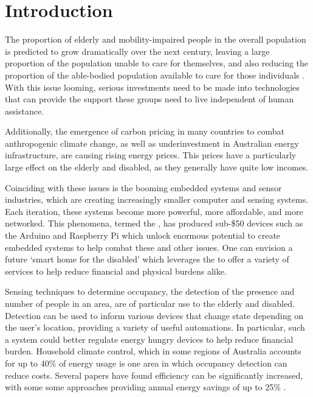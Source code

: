 \documentclass[../thesis/thesis.tex]{subfiles}
\begin{document}
\chapter{Introduction}
 
The proportion of elderly and mobility-impaired people in the overall population is predicted to grow dramatically over the next century, leaving a large proportion of the population unable to care for themselves, and also reducing the proportion of the able-bodied population available to care for those individuals \cite{chan2009smart}. With this issue looming, serious investments need to be made into technologies that can provide the support these groups need to live independent of human assistance. 

Additionally, the emergence of carbon pricing in many countries to combat anthropogenic climate change, as well as underinvestment in Australian energy infrastructure, are causing rising energy prices. This prices have a particularly large effect on the elderly and disabled, as they generally have quite low incomes. %

Coinciding with these issues is the booming embedded systems and sensor industries, which are creating increasingly smaller computer and sensing systems. Each iteration, these systems become more powerful, more affordable, and more networked. This phenomena, termed the \iot, has produced sub-\$50 devices such as the Arduino and Raspberry Pi which unlock enormous potential to create embedded systems to help combat these and other issues. One can envision a future `smart home for the disabled' which leverages the \iot to offer a variety of services to help reduce financial and physical burdens alike.

Sensing techniques to determine occupancy, the detection of the presence and number of people in an area, are of particular use to the elderly and disabled. Detection can be used to inform various devices that change state depending on the user's location, providing a variety of useful automations. In particular, such a system could better regulate energy hungry devices to help reduce financial burden. Household climate control, which in some regions of Australia accounts for up to 40\% of energy usage \cite{abs4602} is one area in which occupancy detection can reduce costs. Several papers have found efficiency can be significantly increased, with some some approaches providing annual energy savings of up to 25\% \cite{beltran2013thermosense}.
 
\end{document}
